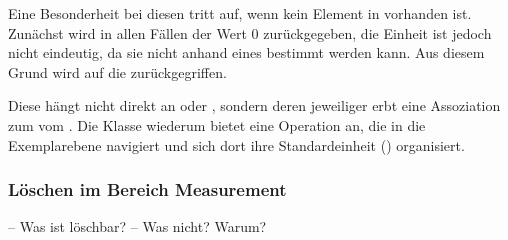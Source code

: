 Eine Besonderheit bei diesen  tritt auf, wenn kein Element in  vorhanden ist.
Zunächst wird in allen Fällen der Wert 0 zurückgegeben, die Einheit ist jedoch nicht eindeutig, da sie nicht anhand
eines  bestimmt werden kann. Aus diesem Grund wird auf die  zurückgegriffen.

Diese hängt nicht direkt an  oder , sondern deren jeweiliger  erbt eine
Assoziation zum  vom . Die Klasse  wiederum
bietet eine Operation  an, die in die Exemplarebene navigiert und sich dort ihre Standardeinheit
() organisiert.


\subsubsection{Löschen im Bereich Measurement}

-- Was ist löschbar?
-- Was nicht? Warum?